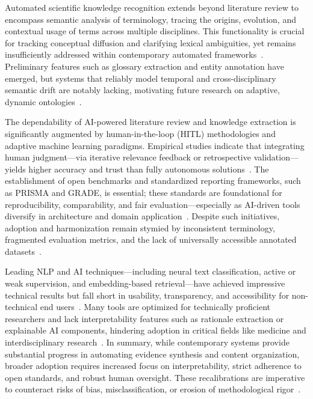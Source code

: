 \documentclass[sigconf]{acmart}
\begin{document}
Automated scientific knowledge recognition extends beyond literature review to encompass semantic analysis of terminology, tracing the origins, evolution, and contextual usage of terms across multiple disciplines. This functionality is crucial for tracking conceptual diffusion and clarifying lexical ambiguities, yet remains insufficiently addressed within contemporary automated frameworks~\cite{ref111}. Preliminary features such as glossary extraction and entity annotation have emerged, but systems that reliably model temporal and cross-disciplinary semantic drift are notably lacking, motivating future research on adaptive, dynamic ontologies~\cite{ref89,ref111}.

The dependability of AI-powered literature review and knowledge extraction is significantly augmented by human-in-the-loop (HITL) methodologies and adaptive machine learning paradigms. Empirical studies indicate that integrating human judgment—via iterative relevance feedback or retrospective validation—yields higher accuracy and trust than fully autonomous solutions~\cite{ref80,ref86,ref88,ref89,ref91,ref94,ref98,ref108}. The establishment of open benchmarks and standardized reporting frameworks, such as PRISMA and GRADE, is essential; these standards are foundational for reproducibility, comparability, and fair evaluation—especially as AI-driven tools diversify in architecture and domain application~\cite{ref34,ref78,ref80,ref102,ref104}. Despite such initiatives, adoption and harmonization remain stymied by inconsistent terminology, fragmented evaluation metrics, and the lack of universally accessible annotated datasets~\cite{ref86,ref80,ref98,ref104}.

Leading NLP and AI techniques—including neural text classification, active or weak supervision, and embedding-based retrieval—have achieved impressive technical results but fall short in usability, transparency, and accessibility for non-technical end users~\cite{ref46,ref38,ref49,ref51,ref86,ref108}. Many tools are optimized for technically proficient researchers and lack interpretability features such as rationale extraction or explainable AI components, hindering adoption in critical fields like medicine and interdisciplinary research~\cite{ref47,ref49,ref94,ref96}. In summary, while contemporary systems provide substantial progress in automating evidence synthesis and content organization, broader adoption requires increased focus on interpretability, strict adherence to open standards, and robust human oversight. These recalibrations are imperative to counteract risks of bias, misclassification, or erosion of methodological rigor~\cite{ref35,ref38,ref46,ref51,ref94,ref98,ref102,ref111}.
\end{document}
